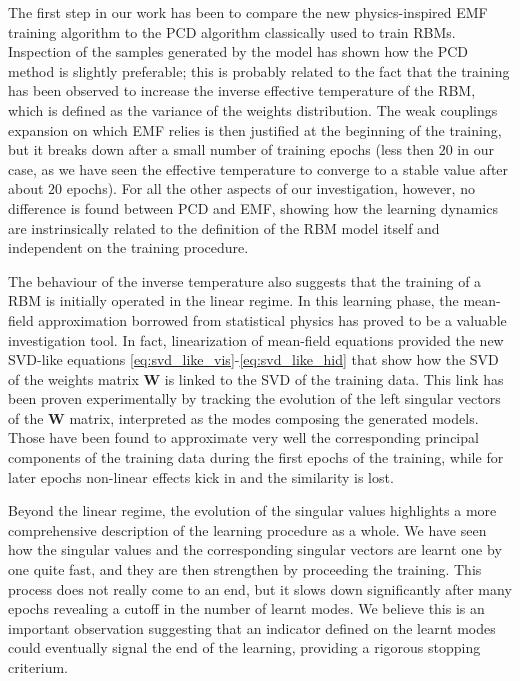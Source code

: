 \documentclass[notitlepage]{revtex4-1}
\begin{document}
The first step in our work has been to compare the new physics-inspired EMF training algorithm to the PCD algorithm classically used to train RBMs. Inspection of the samples generated by the model has shown how the PCD method is slightly preferable; this is probably related to the fact that the training has been observed to increase the inverse effective temperature of the RBM, which is defined as the variance of the weights distribution. The weak couplings expansion on which EMF relies is then justified at the beginning of the training, but it breaks down after a small number of training epochs (less then \(20\) in our case, as we have seen the effective temperature to converge to a stable value after about \(20\) epochs). For all the other aspects of our investigation, however, no difference is found between PCD and EMF, showing how the learning dynamics are instrinsically related to the definition of the RBM model itself and independent on the training procedure.

The behaviour of the inverse temperature also suggests that the training of a RBM is initially operated in the linear regime. In this learning phase, the mean-field approximation borrowed from statistical physics has proved to be a valuable investigation tool. In fact, linearization of mean-field equations provided the new SVD-like equations \eqref{eq:svd_like_vis}-\eqref{eq:svd_like_hid} that show how the SVD of the weights matrix \(\mathbf{W}\) is linked to the SVD of the training data. This link has been proven experimentally by tracking the evolution of the left singular vectors of the \(\mathbf{W}\) matrix, interpreted as the modes composing the generated models. Those have been found to approximate very well the corresponding principal components of the training data during the first epochs of the training, while for later epochs non-linear effects kick in and the similarity is lost.

Beyond the linear regime, the evolution of the singular values highlights a more comprehensive description of the learning procedure as a whole. We have seen how the singular values and the corresponding singular vectors are learnt one by one quite fast, and they are then strengthen by proceeding the training. This process does not really come to an end, but it slows down significantly after many epochs revealing a cutoff in the number of learnt modes. We believe this is an important observation suggesting that an indicator defined on the learnt modes could eventually signal the end of the learning, providing a rigorous stopping criterium.
\end{document}
